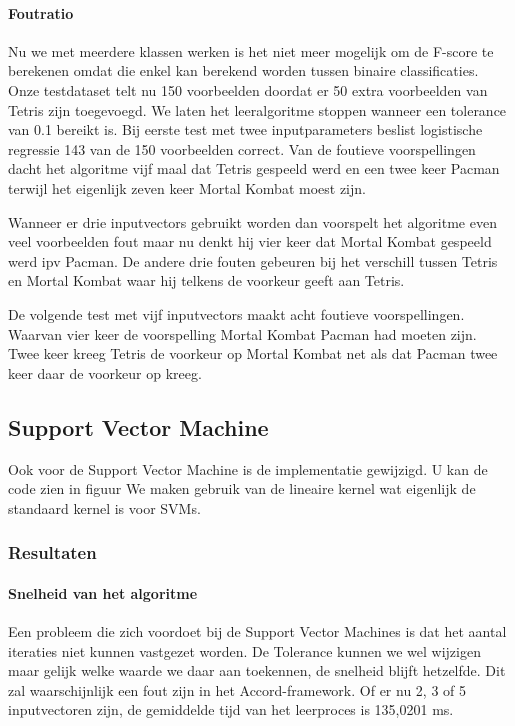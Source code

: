 \paragraph{Foutratio} 

Nu we met meerdere klassen werken is het niet meer mogelijk om de F-score te berekenen omdat die enkel kan berekend worden tussen binaire classificaties. Onze testdataset telt nu 150 voorbeelden doordat er 50 extra voorbeelden van Tetris zijn toegevoegd. We laten het leeralgoritme stoppen wanneer een tolerance van 0.1 bereikt is. Bij eerste test met twee inputparameters beslist logistische regressie 143 van de 150 voorbeelden correct. Van de foutieve voorspellingen dacht het algoritme vijf maal dat Tetris gespeeld werd en een twee keer Pacman terwijl het eigenlijk zeven keer Mortal Kombat moest zijn. 

Wanneer er drie inputvectors gebruikt worden dan voorspelt het algoritme even veel voorbeelden fout maar nu denkt hij vier keer dat Mortal Kombat gespeeld werd ipv Pacman. De andere drie fouten gebeuren bij het verschill tussen Tetris en Mortal Kombat waar hij telkens de voorkeur geeft aan Tetris.

De volgende test met vijf inputvectors maakt acht foutieve voorspellingen. Waarvan vier keer de voorspelling Mortal Kombat Pacman had moeten zijn. Twee keer kreeg Tetris de voorkeur op Mortal Kombat net als dat Pacman twee keer daar de voorkeur op kreeg.


\newpage
\subsection{Support Vector Machine}
\label{sec:supportvectormachineFase4}
Ook voor de Support Vector Machine is de implementatie gewijzigd. U kan de code zien in figuur We maken gebruik van de lineaire kernel wat eigenlijk de standaard kernel is voor SVMs.


\subsubsection{Resultaten}
\paragraph{Snelheid van het algoritme} 
Een probleem die zich voordoet bij de Support Vector Machines is dat het aantal iteraties niet kunnen vastgezet worden. De Tolerance kunnen we wel wijzigen maar gelijk welke waarde we daar aan toekennen, de snelheid blijft hetzelfde. Dit zal waarschijnlijk een fout zijn in het Accord-framework. Of er nu 2, 3 of 5 inputvectoren zijn, de gemiddelde tijd van het leerproces is 135,0201 ms.


